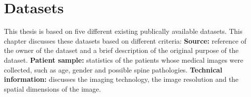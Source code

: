 \chapter{Datasets\label{sec:datasets}}\thispagestyle{empty}
\par{
    This thesis is based on five different existing publically available datasets.
    This chapter discusses these datasets based on different criteria: \newline
    \textbf{Source:} reference of the owner of the dataset and a brief description of the original purpose of the dataset.\newline
    \textbf{Patient sample:} statistics of the patients whose medical images were collected, such as age, gender and possible spine pathologies.\newline
    \textbf{Technical information:} discusses the imaging technology, the image resolution and the spatial dimensions of the image. 
}

